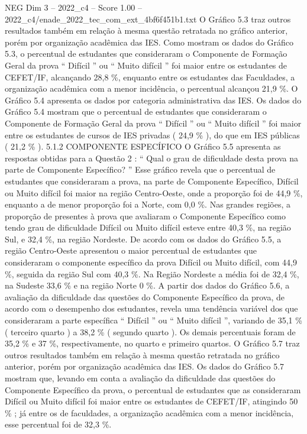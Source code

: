 \begin{textsample}{NEG Dim 3 – 2022\_c4 – Score 1.00 – 2022\_c4/enade\_2022\_tec\_com\_ext\_4bf6f451b1.txt}
O Gráfico 5.3 traz outros resultados também em relação à mesma questão retratada no gráfico anterior, porém por organização acadêmica das IES.
Como mostram os dados do Gráfico 5.3, o percentual de estudantes que consideraram o Componente de Formação Geral da prova “ Difícil ” ou “ Muito difícil ” foi maior entre os estudantes de CEFET/IF, alcançando 28,8 \%, enquanto entre os estudantes das Faculdades, a organização acadêmica com a menor incidência, o percentual alcançou 21,9 \%.
O Gráfico 5.4 apresenta os dados por categoria administrativa das IES.
Os dados do Gráfico 5.4 mostram que o percentual de estudantes que consideraram o Componente de Formação Geral da prova “ Difícil ” ou “ Muito difícil ” foi maior entre os estudantes de cursos de IES privadas ( 24,9 \% ), do que em IES públicas ( 21,2 \% ). 5.1.2 COMPONENTE ESPECÍFICO O Gráfico 5.5 apresenta as respostas obtidas para a Questão 2 : “ Qual o grau de dificuldade desta prova na parte de Componente Específico? ” Esse gráfico revela que o percentual de estudantes que consideraram a prova, na parte de Componente Específico, Difícil ou Muito difícil foi maior na região Centro-Oeste, onde a proporção foi de 44,9 \%, enquanto a de menor proporção foi a Norte, com 0,0 \%.
Nas grandes regiões, a proporção de presentes à prova que avaliaram o Componente Específico como tendo grau de dificuldade Difícil ou Muito difícil esteve entre 40,3 \%, na região Sul, e 32,4 \%, na região Nordeste.
De acordo com os dados do Gráfico 5.5, a região Centro-Oeste apresentou o maior percentual de estudantes que consideraram o componente específico da prova Difícil ou Muito difícil, com 44,9 \%, seguida da região Sul com 40,3 \%.
Na Região Nordeste a média foi de 32,4 \%, na Sudeste 33,6 \% e na região Norte 0 \%.
A partir dos dados do Gráfico 5.6, a avaliação da dificuldade das questões do Componente Específico da prova, de acordo com o desempenho dos estudantes, revela uma tendência variável dos que consideraram a parte específica “ Difícil ” ou “ Muito difícil ”, variando de 35,1 \% ( terceiro quarto ) a 38,2 \% ( segundo quarto ).
Os demais percentuais foram de 35,2 \% e 37 \%, respectivamente, no quarto e primeiro quartos.
O Gráfico 5.7 traz outros resultados também em relação à mesma questão retratada no gráfico anterior, porém por organização acadêmica das IES.
Os dados do Gráfico 5.7 mostram que, levando em conta a avaliação da dificuldade das questões do Componente Específico da prova, o percentual de estudantes que as consideraram Difícil ou Muito difícil foi maior entre os estudantes de CEFET/IF, atingindo 50 \% ; já entre os de faculdades, a organização acadêmica com a menor incidência, esse percentual foi de 32,3 \%.

\end{textsample}
